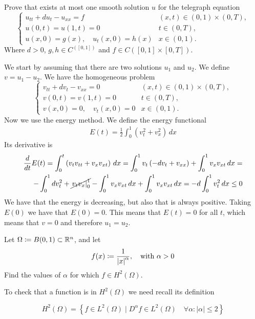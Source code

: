 \begin{exercise}
    Prove that exists at most one smooth solution \(u\) for the telegraph equation
    \[
        \begin{cases}
            u_{tt} + d u_t - u_{xx} = f & (x, t) \in (0,1) \times (0, T), \\
            u(0, t) = u(1, t) = 0 & t \in (0, T), \\
            u(x, 0) = g(x), \quad u_t(x, 0) = h(x) & x \in (0, 1).
        \end{cases}
    \]
    Where \(d > 0\), \(g, h \in C^([0, 1])\) and \(f \in C([0, 1] \times [0, T])\).
\end{exercise}
We start by assuming that there are two solutions \(u_1\) and \(u_2\). We define \(v = u_1 - u_2\). We have the homogeneous problem
\[
    \begin{cases}
        v_{tt} + d v_t - v_{xx} = 0 & (x, t) \in (0,1) \times (0, T), \\
        v(0, t) = v(1, t) = 0 & t \in (0, T), \\
        v(x, 0) = 0, \quad v_t(x, 0) = 0 & x \in (0, 1).
    \end{cases}
\]
Now we use the energy method. We define the energy functional
\[
    \begin{split}
        E(t) = \frac{1}{2} \int_0^1 \left(v_t^2 + v_x^2\right) \, dx
    \end{split}
\]
Its derivative is 
\[
    \begin{split}
        \frac{d}{dt} E(t) = \int_0^t \left(v_t v_{tt} + v_x v_{xt}\right) \, dx = \int_0^1 v_t\left(-d v_t + v_{xx}\right) + \int_0^1 v_x v_{xt} \, dx = \\
        -\int_0^1 d v_t^2 + \cancel{\left. v_t v_x \right|_0^1} - \int_0^1 v_x v_{xt} \, dx  + \int_0^1 v_x v_{xt} \, dx = -d \int_0^1 v_t^2 \, dx \leq 0
    \end{split}
\]
We have that the energy is decreasing, but also that is always positive. Taking \(E(0)\) we have that \(E(0) = 0\). This means that \(E(t) = 0\) for all \(t\), which means that \(v = 0\) and therefore \(u_1 = u_2\).  
\newpage
\begin{exercise}
    Let \(\Omega \coloneqq B(0, 1) \subset \mathbb{R}^n\), and let 
    \[
        f(x) \coloneqq \frac{1}{\abs{x}^\alpha}, \quad \text{with } \alpha > 0
    \]
    Find the values of \(\alpha\) for which \(f \in H^2(\Omega)\).
\end{exercise}
To check that a function is in \(H^2(\Omega)\) we need recall its definition
\begin{remark}
\[H^2(\Omega) = \left\{ f \in L^2(\Omega) \mid D^\alpha f \in L^2(\Omega) \quad \forall \alpha : |\alpha|\leq 2\right\}\]
\end{remark}
